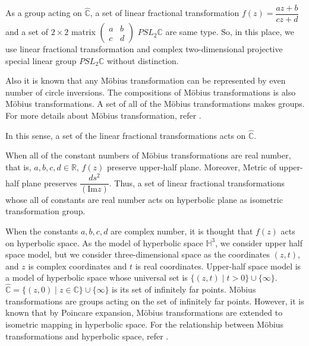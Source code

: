 As a group acting on $\hat{\mathbb{C}}$, a set of linear fractional
transformation $f(z) = \dfrac{az + b}{cz + d}$
and a set of $2 \times 2$ matrix
$\begin{pmatrix}a & b \\ c& d \end{pmatrix}$
$PSL_2\mathbb{C}$ are same type.
So, in this place, we use linear fractional transformation and
complex two-dimensional projective special linear group
$PSL_2\mathbb{C}$ without distinction.


Also it is known that any M\"obius transformation can be represented by
even number of circle inversions.
The compositions of M\"obius transformations is also M\"obius
transformations. A set of all of the M\"obius transformations makes
groups. For more details about M\"obius transformation, refer
\cite{MumfordSeriesWright200204}\cite{marden_2016}.

In this sense, a set of the linear fractional transformations acts on
$\hat{\mathbb{C}}$.

When all of the constant numbers of M\"obius transformations are real number,
that is, $a, b, c, d \in \mathbb{R}$, $f(z)$ preserve upper-half plane.
Moreover, Metric of upper-half plane preserves
$\dfrac{ds^2}{(\mathrm{Im}z)}$.
Thus, a set of linear fractional transformations whose all of constants
are real number acts on hyperbolic plane as isometric transformation group.

When the constants $a, b, c, d$ are complex number, it is thought that
$f(z)$ acts on hyperbolic space.
As the model of hyperbolic space $\mathbb{H}^3$, we consider upper half
space model, but we consider three-dimensional space as the coordinates
$(z, t)$, and $z$ is complex coordinates and $t$ is real coordinates.
Upper-half space model is a model of hyperbolic space whose universal
set is $\{(z,t) \mid t>0\}\cup \{ \infty \}$.
$\hat{\mathbb{C}} = \{ (z,0) \mid z \in \mathbb{C}\} \cup \{ \infty\}$
is its set of infinitely far points. M\"obius transformations are groups acting on
the set of infinitely far points. However, it is known that by Poincare
expansion, M\"obius transformations are extended to isometric mapping
in hyperbolic space.
For the relationship between M\"obius transformations and hyperbolic
space, refer 
\cite{Marden200705outerCircles}\cite{taniguchi_okumura199610invitation}.


